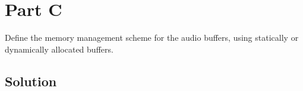 \section*{Part C}

Define the memory management scheme for the audio buffers, using statically or dynamically allocated buffers.

\subsection*{Solution}

